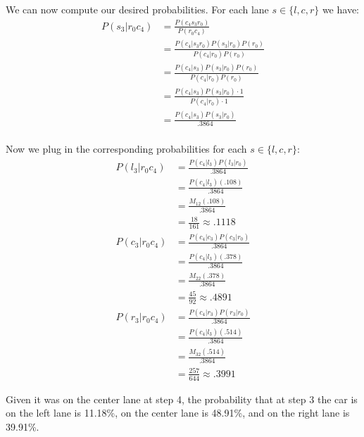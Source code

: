 \documentclass{article}
\begin{document}
We can now compute our desired probabilities. For each lane $s\in\{l,c,r\}$ we have:
\begin{align*}
P(s_3|r_0c_4)&=\frac{P(c_4s_3r_0)}{P(r_0c_4)}\tag{def. of conditional prob.}\\
&=\frac{P(c_4|s_3r_0)P(s_3|r_0)P(r_0)}{P(c_4|r_0)P(r_0)}\tag{chain rule}\\
&=\frac{P(c_4|s_3)P(s_3|r_0)P(r_0)}{P(c_4|r_0)P(r_0)}\tag{Markov property}\\
&=\frac{P(c_4|s_3)P(s_3|r_0)\cdot1}{P(c_4|r_0)\cdot1}\tag{initial distribution}\\
&=\frac{P(c_4|s_3)P(s_3|r_0)}{.3864}\tag{calculated above}\\
\end{align*}

Now we plug in the corresponding probabilities for each $s\in\{l,c,r\}$:
\begin{align*}
  P(l_3|r_0c_4)&=\frac{P(c_4|l_3)P(l_3|r_0)}{.3864}\\
  &=\frac{P(c_4|l_3)(.108)}{.3864}\tag{part a}\\
  &=\frac{M_{12}(.108)}{.3864}\tag{def. of transition prob.}\\
  &=\frac{18}{161}\approx.1118\\
  P(c_3|r_0c_4)&=\frac{P(c_4|c_3)P(c_3|r_0)}{.3864}\\
  &=\frac{P(c_4|l_3)(.378)}{.3864}\tag{part a}\\
  &=\frac{M_{22}(.378)}{.3864}\tag{def. of transition prob.}\\
  &=\frac{45}{92}\approx.4891\\
  P(r_3|r_0c_4)&=\frac{P(c_4|r_3)P(r_3|r_0)}{.3864}\\
  &=\frac{P(c_4|l_3)(.514)}{.3864}\tag{part a}\\
  &=\frac{M_{32}(.514)}{.3864}\tag{def. of transition prob.}\\
  &=\frac{257}{644}\approx.3991
\end{align*}

Given it was on the center lane at step 4, the probability that at step 3 the car is on the left lane is 11.18\%, on the center lane is 48.91\%, and on the right lane is 39.91\%.
\bigskip


\end{document}
